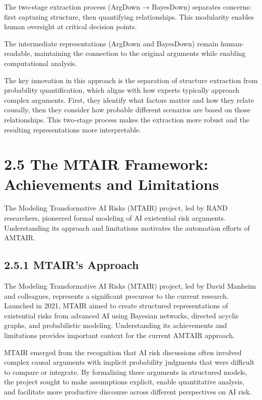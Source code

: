 \documentclass[
  11pt,
  letterpaper,
]{book}
\begin{document}
The two-stage extraction process (ArgDown → BayesDown) separates
concerns: first capturing structure, then quantifying relationships.
This modularity enables human oversight at critical decision points.

The intermediate representations (ArgDown and BayesDown) remain
human-readable, maintaining the connection to the original arguments
while enabling computational analysis.

The key innovation in this approach is the separation of structure
extraction from probability quantification, which aligns with how
experts typically approach complex arguments. First, they identify what
factors matter and how they relate causally, then they consider how
probable different scenarios are based on those relationships. This
two-stage process makes the extraction more robust and the resulting
representations more interpretable.

\section*{2.5 The MTAIR Framework: Achievements and
Limitations}\label{sec-mtair-framework}


The Modeling Transformative AI Risks (MTAIR) project, led by RAND
researchers, pioneered formal modeling of AI existential risk arguments.
Understanding its approach and limitations motivates the automation
efforts of AMTAIR.

\subsection*{2.5.1 MTAIR's Approach}\label{sec-mtair-approach}

The Modeling Transformative AI Risks (MTAIR) project, led by David
Manheim and colleagues, represents a significant precursor to the
current research. Launched in 2021, MTAIR aimed to create structured
representations of existential risks from advanced AI using Bayesian
networks, directed acyclic graphs, and probabilistic modeling.
Understanding its achievements and limitations provides important
context for the current AMTAIR approach.

MTAIR emerged from the recognition that AI risk discussions often
involved complex causal arguments with implicit probability judgments
that were difficult to compare or integrate. By formalizing these
arguments in structured models, the project sought to make assumptions
explicit, enable quantitative analysis, and facilitate more productive
discourse across different perspectives on AI risk.
\end{document}
